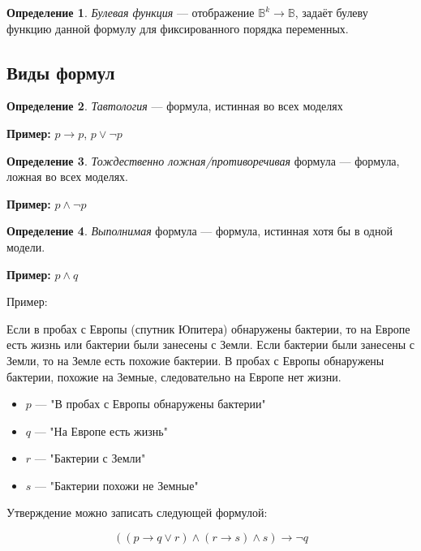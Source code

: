\documentclass[12pt]{article}
\newenvironment{quo}{
  \begin{framed}
    \begin{minipage}{0.97\textwidth}
      \setlength{\parskip}{4mm}
    }{
    \end{minipage}
\end{framed}}
\let\im\rightarrow
\let\n\neg
\newcommand{\task}[2]{
  \begin{quo}
    {\bf #1} #2
\end{quo}}
\theoremstyle{definition}
\newtheorem{definition}{Определение}[section]
\theoremstyle{statement}
\theoremstyle{theorem}
\begin{document}
\begin{definition}
  \textit{Булевая функция} --- отображение $\mathbb{B}^k \to
  \mathbb{B}$, задаёт булеву функцию данной формулу для фиксированного
  порядка переменных.
\end{definition}

\subsection{Виды формул}

\begin{definition}
  \textit{Тавтология} --- формула, истинная во всех моделях

  \textbf{Пример:} $p \im p$, $p \lor \n p$
\end{definition}

\begin{definition}
  \textit{Тождественно ложная/противоречивая} формула --- формула,
  ложная во всех моделях.

  \textbf{Пример:} $p \land \n p$
\end{definition}

\begin{definition}
  \textit{Выполнимая} формула --- формула, истинная хотя бы в одной модели.

  \textbf{Пример:} $p \land q$\\
\end{definition}

Пример:

\task{}{Если в пробах с Европы (спутник Юпитера) обнаружены бактерии,
  то на Европе есть жизнь или бактерии были занесены с Земли. Если
  бактерии были занесены с Земли, то на Земле есть похожие бактерии. В
  пробах с Европы обнаружены бактерии, похожие на Земные, следовательно
на Европе нет жизни.}
\begin{itemize}
  \item $p$ --- "В пробах с Европы обнаружены бактерии"

  \item $q$ --- "На Европе есть жизнь"

  \item $r$ --- "Бактерии с Земли"

  \item $s$ --- "Бактерии похожи не Земные"
\end{itemize}

Утверждение можно записать следующей формулой:

\[
  \left((p \im q \lor r) \land (r \im s) \land s\right) \im \n q
\]
\end{document}
